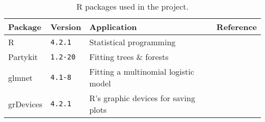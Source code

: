 \begin{table}[H]
    \centering
    \begin{tabular}{|p{2.5cm}||p{2cm}|p{3cm}|p{5cm}|}
        \hline
        \textbf{Package} & \textbf{Version} & \textbf{Application} & \textbf{Reference} \\
        \hline
        \hline
        R & \verb|4.2.1| & Statistical programming & \cite{r} \\
        \hline
        Partykit & \verb|1.2-20| & Fitting trees \& forests & \cite{r:party1} \cite{ctree:art} \cite{r:party3} \\
        \hline
        glmnet & \verb|4.1-8| & Fitting a multinomial logistic model & \cite{r:glmnet1} \cite{r:glmnet2} \\
        \hline
        grDevices & \verb|4.2.1| & R's graphic devices for saving plots & \cite{r} \\
        \hline
    \end{tabular}
    \caption{R packages used in the project.}
    \label{tab:r_packages}
\end{table}
